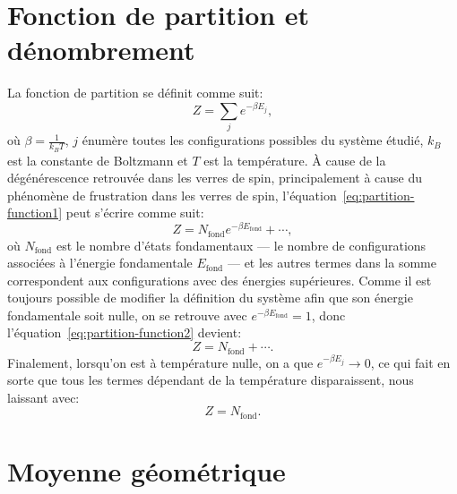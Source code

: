 \begin{comment}
\end{comment}

\appendix
\renewcommand\chapterstring{Annexe}

\chapter{Fonction de partition et dénombrement}\label{annexe:partition-fn-and-counting}
La fonction de partition se définit comme suit:
\begin{equation}\label{eq:partition-function1}
    Z = \sum_{j} e^{-\beta E_j},
\end{equation}
où $\beta = \frac{1}{k_B T}$, $j$ énumère toutes les configurations possibles du système étudié, $k_B$ est la constante de Boltzmann et $T$ est la température.
À cause de la dégénérescence retrouvée dans les verres de spin, principalement à cause du phénomène de frustration dans les verres de spin, l'équation~\ref{eq:partition-function1} peut s'écrire comme suit:
\begin{equation}\label{eq:partition-function2}
    Z = N_{\text{fond}}e^{-\beta E_{\text{fond}}} + \cdots,
\end{equation}
où $N_{\text{fond}}$ est le nombre d'états fondamentaux --- le nombre de configurations associées à l'énergie fondamentale $E_{\text{fond}}$ --- et les autres termes dans la somme correspondent aux configurations avec des énergies supérieures.
Comme il est toujours possible de modifier la définition du système afin que son énergie fondamentale soit nulle, on se retrouve avec $e^{-\beta E_{\text{fond}}} = 1$, donc l'équation~\ref{eq:partition-function2} devient:
\begin{equation}
    Z = N_{\text{fond}} + \cdots.
\end{equation}
Finalement, lorsqu'on est à température nulle, on a que $e^{-\beta E_j} \rightarrow 0$, ce qui fait en sorte que tous les termes dépendant de la température disparaissent, nous laissant avec:
\begin{equation}
    Z = N_{\text{fond}}.
\end{equation}



\chapter{Moyenne géométrique}\label{annexe:geo-mean}

